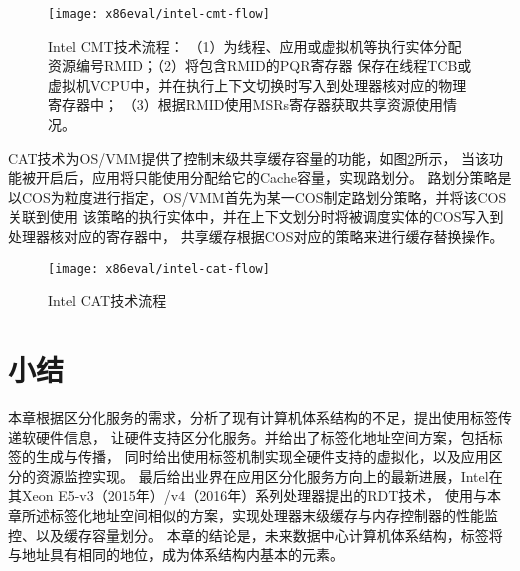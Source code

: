 \begin{figure}[H]
  \centering
  \texttt{[image: x86eval/intel-cmt-flow]}
  \caption[Intel Cache Monitor Technology (CMT) 技术流程]{Intel CMT技术流程：
   （1）为线程、应用或虚拟机等执行实体分配资源编号RMID；（2）将包含RMID的PQR寄存器
   保存在线程TCB或虚拟机VCPU中，并在执行上下文切换时写入到处理器核对应的物理寄存器中；
   （3）根据RMID使用MSRs寄存器获取共享资源使用情况。}
  \label{fig:intel-cmt-flow}
\end{figure}

CAT技术为OS/VMM提供了控制末级共享缓存容量的功能，如图\ref{fig:intel-cat-flow}所示，
当该功能被开启后，应用将只能使用分配给它的Cache容量，实现路划分。
路划分策略是以COS为粒度进行指定，OS/VMM首先为某一COS制定路划分策略，并将该COS关联到使用
该策略的执行实体中，并在上下文划分时将被调度实体的COS写入到处理器核对应的寄存器中，
共享缓存根据COS对应的策略来进行缓存替换操作。

\begin{figure}[H]
  \centering
  \texttt{[image: x86eval/intel-cat-flow]}
  \caption[Intel Cache Allocation Technology (CAT) 技术流程]{Intel CAT技术流程}
  \label{fig:intel-cat-flow}
\end{figure}


\section{小结}

本章根据区分化服务的需求，分析了现有计算机体系结构的不足，提出使用标签传递软硬件信息，
让硬件支持区分化服务。并给出了标签化地址空间方案，包括标签的生成与传播，
同时给出使用标签机制实现全硬件支持的虚拟化，以及应用区分的资源监控实现。
最后给出业界在应用区分化服务方向上的最新进展，Intel在其Xeon E5-v3（2015年）/v4（2016年）系列处理器提出的RDT技术，
使用与本章所述标签化地址空间相似的方案，实现处理器末级缓存与内存控制器的性能监控、以及缓存容量划分。
本章的结论是，未来数据中心计算机体系结构，标签将与地址具有相同的地位，成为体系结构内基本的元素。




